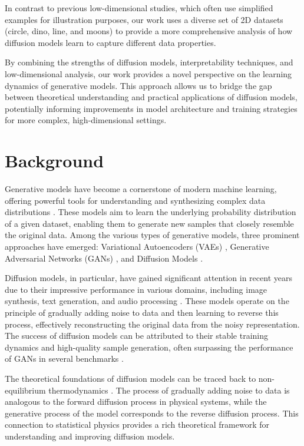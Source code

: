 \documentclass{article} %
\begin{document}
In contrast to previous low-dimensional studies, which often use simplified examples for illustration purposes, our work uses a diverse set of 2D datasets (circle, dino, line, and moons) to provide a more comprehensive analysis of how diffusion models learn to capture different data properties.

By combining the strengths of diffusion models, interpretability techniques, and low-dimensional analysis, our work provides a novel perspective on the learning dynamics of generative models. This approach allows us to bridge the gap between theoretical understanding and practical applications of diffusion models, potentially informing improvements in model architecture and training strategies for more complex, high-dimensional settings.

\section{Background}
\label{sec:background}

Generative models have become a cornerstone of modern machine learning, offering powerful tools for understanding and synthesizing complex data distributions \cite{goodfellow2016deep}. These models aim to learn the underlying probability distribution of a given dataset, enabling them to generate new samples that closely resemble the original data. Among the various types of generative models, three prominent approaches have emerged: Variational Autoencoders (VAEs) \cite{vae}, Generative Adversarial Networks (GANs) \cite{gan}, and Diffusion Models \cite{ddpm}.

Diffusion models, in particular, have gained significant attention in recent years due to their impressive performance in various domains, including image synthesis, text generation, and audio processing \cite{yang2023diffusion}. These models operate on the principle of gradually adding noise to data and then learning to reverse this process, effectively reconstructing the original data from the noisy representation. The success of diffusion models can be attributed to their stable training dynamics and high-quality sample generation, often surpassing the performance of GANs in several benchmarks \cite{ddpm}.

The theoretical foundations of diffusion models can be traced back to non-equilibrium thermodynamics \cite{pmlr-v37-sohl-dickstein15}. The process of gradually adding noise to data is analogous to the forward diffusion process in physical systems, while the generative process of the model corresponds to the reverse diffusion process. This connection to statistical physics provides a rich theoretical framework for understanding and improving diffusion models.
\end{document}
